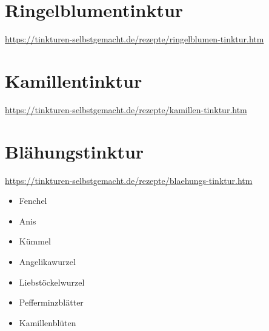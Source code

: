 \newpage


\section{Ringelblumentinktur}
\label{   }

\cite{tinkturen}

\url{https://tinkturen-selbstgemacht.de/rezepte/ringelblumen-tinktur.htm}







\newpage


\section{Kamillentinktur}
\label{   }


\cite{tinkturen}

\url{https://tinkturen-selbstgemacht.de/rezepte/kamillen-tinktur.htm}






\newpage


\section{Blähungstinktur}
\label{   }

\cite{tinkturen}  

\url{https://tinkturen-selbstgemacht.de/rezepte/blaehungs-tinktur.htm}


\begin{itemize}
	\item Fenchel
	\item Anis
	\item Kümmel
	\item Angelikawurzel
	\item Liebstöckelwurzel
	\item Pefferminzblätter
	\item Kamillenblüten
\end{itemize}

